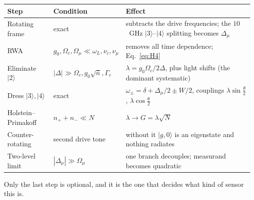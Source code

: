 \documentclass[11pt,a4paper]{article}
\newcommand{\ket}[1]{\lvert #1 \rangle}
\newcommand{\Om}{\Omega}
\newcommand{\Omu}{\Omega_{\mu}}
\newcommand{\Dmu}{\Delta_{\mu}}
\begin{document}
\begin{center}\small
\begin{tabular}{@{}>{\raggedright\arraybackslash}p{3.4cm}>{\raggedright\arraybackslash}p{3.6cm}>{\raggedright\arraybackslash}p{7.0cm}@{}}
\toprule
\textbf{Step} & \textbf{Condition} & \textbf{Effect}\\
\midrule
Rotating frame & exact & subtracts the drive frequencies; the $10$~GHz
  $\ket{3}$--$\ket{4}$ splitting becomes $\Dmu$\\
RWA & $g_0,\Om_c,\Omu\ll\omega_L,\nu_c,\nu_\mu$ & removes all time dependence; Eq.~\eqref{eq:H4}\\
Eliminate $\ket{2}$ & $|\Delta|\gg\Om_c,g_0\sqrt{\bar n},\Gamma_e$ &
  $\lambda=g_0\Om_c/2\Delta$, plus light shifts (the dominant systematic)\\
Dress $\ket{3},\ket{4}$ & exact & $\omega_\pm=\delta+\Dmu/2\pm W/2$, couplings
  $\lambda\sin\tfrac\theta2$, $\lambda\cos\tfrac\theta2$\\
Holstein--Primakoff & $n_++n_-\ll N$ & $\lambda\to G=\lambda\sqrt N$\\
Counter-rotating & second drive tone & without it $\ket{g,0}$ is an eigenstate and nothing radiates\\
Two-level limit & $|\Dmu|\gg\Omu$ & one branch decouples; measurand becomes quadratic\\
\bottomrule
\end{tabular}
\end{center}

\noindent Only the last step is optional, and it is the one that decides what kind of sensor
this is.
\end{document}
